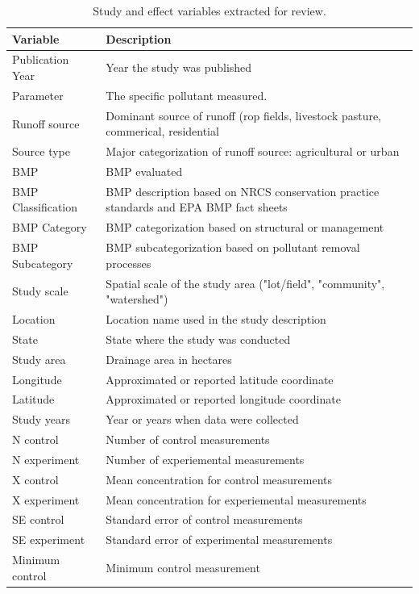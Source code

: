 \documentclass[utf8]{FrontiersinHarvard}
\begin{document}
\begin{table}

\caption{\label{tab:datvars}Study and effect variables extracted for review.}
\centering
\begin{tabular}[t]{>{\raggedright\arraybackslash}p{10em}>{\raggedright\arraybackslash}p{25em}}
\toprule
Variable & Description\\
\midrule
Publication Year & Year the study was published\\
Parameter & The specific pollutant measured.\\
Runoff source & Dominant source of runoff (rop fields, livestock pasture, commerical, residential\\
Source type & Major categorization of runoff source: agricultural or urban\\
BMP & BMP evaluated\\
\addlinespace
BMP Classification & BMP description based on NRCS conservation practice standards and EPA BMP fact sheets\\
BMP Category & BMP categorization based on structural or management\\
BMP Subcategory & BMP subcategorization based on pollutant removal processes\\
Study scale & Spatial scale of the study area ("lot/field", "community", "watershed")\\
Location & Location name used in the study description\\
\addlinespace
State & State where the study was conducted\\
Study area & Drainage area in hectares\\
Longitude & Approximated or reported latitude coordinate\\
Latitude & Approximated or reported longitude coordinate\\
Study years & Year or years when data were collected\\
\addlinespace
N control & Number of control measurements\\
N experiment & Number of experiemental measurements\\
X control & Mean concentration for control measurements\\
X experiment & Mean concentration for experiemental measurements\\
SE control & Standard error of control measurements\\
\addlinespace
SE experiment & Standard error of experimental measurements\\
Minimum control & Minimum control measurement\\

\end{tabular}
\end{table}
\end{document}
